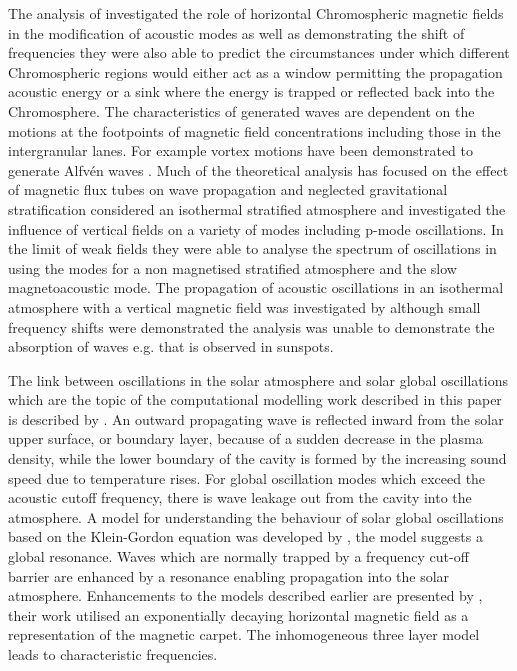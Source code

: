 \documentclass[linenumbers]{aastex63}
\begin{document}
The analysis of \citet{Campbell1989} investigated the role of horizontal Chromospheric magnetic fields in the modification of acoustic modes as well as demonstrating the shift of frequencies they were also able to predict the circumstances under which different Chromospheric regions would either act as a window permitting the propagation acoustic energy or a sink where the energy is trapped or reflected back into the Chromosphere.  The characteristics of generated waves are dependent on the motions at the footpoints of magnetic field concentrations including those in the intergranular lanes. For example vortex motions have been demonstrated to generate Alfv\'en waves \citet{Fedun2009b}. Much of the theoretical analysis has focused on the effect of magnetic flux tubes on wave propagation and neglected gravitational stratification \citet{Hasan1992} considered an isothermal stratified atmosphere and investigated the influence of vertical fields on a variety of modes including p-mode oscillations. In the limit of weak fields they were able to analyse the spectrum of oscillations in using the modes for a non magnetised stratified atmosphere and the slow magnetoacoustic mode.   The propagation of acoustic oscillations in an isothermal atmosphere with a vertical magnetic field was investigated by \citet{Hindman1996} although small frequency shifts were demonstrated the analysis was unable to demonstrate the absorption of waves  e.g. that is observed in sunspots. 

The link between oscillations in the solar atmosphere and solar global oscillations which are the topic of the computational modelling work described in this paper is described by \citet{Erdelyi2006}.
 An outward propagating wave is reflected inward from the solar upper surface, or boundary layer, because of a sudden decrease in the plasma density, while the lower boundary of the cavity is formed by the increasing sound speed due to temperature rises. For global oscillation modes which exceed the acoustic cutoff frequency, there is wave leakage out from the cavity into the atmosphere. A model for understanding the behaviour of solar global oscillations based on the Klein-Gordon equation was developed by \citet{Taroyan2008}, the model suggests a global resonance. Waves which are normally trapped by a frequency cut-off barrier are enhanced by a resonance enabling propagation into the solar atmosphere. Enhancements to the models described earlier are presented by \citet{Pinter2007}, their work utilised an exponentially decaying horizontal magnetic field as a representation of the magnetic carpet. The inhomogeneous three layer model leads to characteristic frequencies. 
\end{document}
